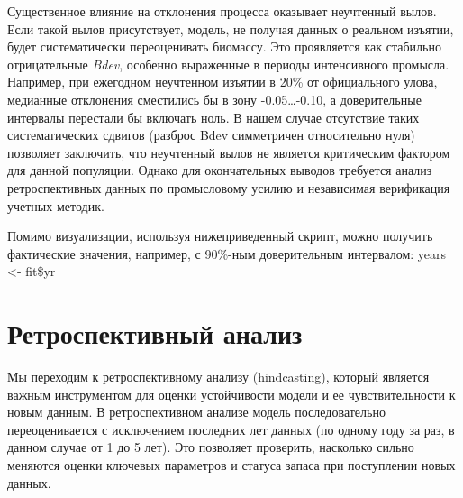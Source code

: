 \documentclass[
  letterpaper,
  DIV=11,
  numbers=noendperiod]{scrreprt}
\newenvironment{Shaded}{\begin{snugshade}}{\end{snugshade}}
\newcommand{\AttributeTok}[1]{\textcolor[rgb]{0.40,0.45,0.13}{#1}}
\newcommand{\CommentTok}[1]{\textcolor[rgb]{0.37,0.37,0.37}{#1}}
\newcommand{\ControlFlowTok}[1]{\textcolor[rgb]{0.00,0.23,0.31}{\textbf{#1}}}
\newcommand{\FloatTok}[1]{\textcolor[rgb]{0.68,0.00,0.00}{#1}}
\newcommand{\FunctionTok}[1]{\textcolor[rgb]{0.28,0.35,0.67}{#1}}
\newcommand{\NormalTok}[1]{\textcolor[rgb]{0.00,0.23,0.31}{#1}}
\newcommand{\OtherTok}[1]{\textcolor[rgb]{0.00,0.23,0.31}{#1}}
\newcommand{\SpecialCharTok}[1]{\textcolor[rgb]{0.37,0.37,0.37}{#1}}
\begin{document}
Существенное влияние на отклонения процесса оказывает неучтенный вылов.
Если такой вылов присутствует, модель, не получая данных о реальном
изъятии, будет систематически переоценивать биомассу. Это проявляется
как стабильно отрицательные \emph{Bdev}, особенно выраженные в периоды
интенсивного промысла. Например, при ежегодном неучтенном изъятии в 20\%
от официального улова, медианные отклонения сместились бы в зону
-0.05\ldots-0.10, а доверительные интервалы перестали бы включать ноль.
В нашем случае отсутствие таких систематических сдвигов (разброс Bdev
симметричен относительно нуля) позволяет заключить, что неучтенный вылов
не является критическим фактором для данной популяции. Однако для
окончательных выводов требуется анализ ретроспективных данных по
промысловому усилию и независимая верификация учетных методик.

Помимо визуализации, используя нижеприведенный скрипт, можно получить
фактические значения, например, с 90\%-ным доверительным интервалом:
years \textless- fit\$yr

\begin{Shaded}
\end{Shaded}

\section{Ретроспективный
анализ}\label{ux440ux435ux442ux440ux43eux441ux43fux435ux43aux442ux438ux432ux43dux44bux439-ux430ux43dux430ux43bux438ux437-1}

Мы переходим к ретроспективному анализу (hindcasting), который является
важным инструментом для оценки устойчивости модели и ее чувствительности
к новым данным. В ретроспективном анализе модель последовательно
переоценивается с исключением последних лет данных (по одному году за
раз, в данном случае от 1 до 5 лет). Это позволяет проверить, насколько
сильно меняются оценки ключевых параметров и статуса запаса при
поступлении новых данных.
\end{document}

